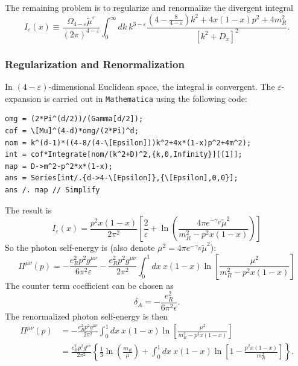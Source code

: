 The remaining problem is to regularize and renormalize the divergent integral
\begin{equation}
	I_\varepsilon(x) \equiv \frac{\Omega_{4-\varepsilon} \tilde{\mu}^\varepsilon}{(2\pi)^{4-\varepsilon}} \int_0^\infty dk\ k^{3-\varepsilon} \frac{\left(4-\frac{8}{4-\varepsilon} \right) k^{2}+4x(1-x) p^{2}+4m_R^{2}}{\left[k^{2}+D_x\right]^{2}}.
\end{equation}

\subsubsection{Regularization and Renormalization}
In $(4-\varepsilon)$-dimensional Euclidean space, the integral is convergent.
The $\varepsilon$-expansion is carried out in \texttt{Mathematica} using the following code:

\begin{lstlisting}[style=mathematicaFrameTB]
omg = (2*Pi^(d/2))/(Gamma[d/2]);
cof = \[Mu]^(4-d)*omg/(2*Pi)^d;
nom = k^(d-1)*((4-8/(4-\[Epsilon]))k^2+4x*(1-x)p^2+4m^2);
int = cof*Integrate[nom/(k^2+D)^2,{k,0,Infinity}][[1]];
map = D->m^2-p^2*x*(1-x);
ans = Series[int/.{d->4-\[Epsilon]},{\[Epsilon],0,0}];
ans /. map // Simplify
\end{lstlisting}

The result is
\begin{equation}
	I_\varepsilon(x) = \frac{p^2 x(1-x)}{2\pi^2} \left[\frac{2}{\varepsilon}+\ln\left(\frac{4\pi e^{-\gamma_E} \tilde\mu^2}{m_R^2-p^2 x(1-x)}\right)\right]
\end{equation}
So the photon self-energy is (also denote $\mu^2=4\pi e^{-\gamma_E} \tilde\mu^2$):
\begin{equation}
	\Pi^{\mu\nu}(p) 
	= -\frac{e_R^2 p^2 g^{\mu\nu}}{6\pi^2 \varepsilon} 
	-\frac{e_R^2 p^2 g^{\mu\nu}}{2\pi^2} \int_0^1 dx\ x(1-x)
	\ln\left[\frac{\mu^2}{m_R^2-p^2 x(1-x)}\right]
\end{equation}
The counter term coefficient can be chosen as
\begin{equation}
	\delta_A = -\frac{e_R^2}{6\pi^2 \epsilon}.
\end{equation}
The renormalized photon self-energy is then
\begin{equation}
\begin{aligned}
	\Pi^{\mu\nu}(p) 
	&= -\frac{e_R^2 p^2 g^{\mu\nu}}{2\pi^2} \int_0^1 dx\ x(1-x)
	\ln\left[\frac{\mu^2}{m_R^2-p^2 x(1-x)}\right] \\
	&= \frac{e_R^2 p^2 g^{\mu\nu}}{2\pi^2} \left\{\frac{1}{3}\ln\left(\frac{m_R}{\mu}\right)
	 + \int_0^{1} dx\ x(1-x) \ln\left[1-\frac{p^2 x(1-x)}{m_R^2}\right] \right\}.
\end{aligned}
\end{equation}


